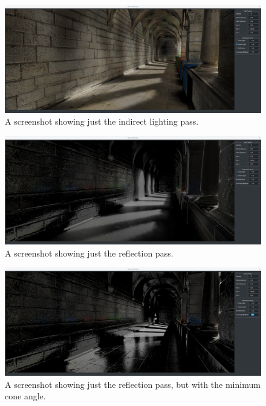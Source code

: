 \documentclass[]{acmsiggraph}
\begin{document}
\begin{figure}[htbp]\centering
 \includegraphics[width=1.0\linewidth]{images/indirect_only}
 \caption{A screenshot showing just the indirect lighting pass.}
\end{figure}

\begin{figure}[htbp]\centering
 \includegraphics[width=1.0\linewidth]{images/reflection_only}
 \caption{A screenshot showing just the reflection pass.}
\end{figure}

\begin{figure}[htbp]\centering
 \includegraphics[width=1.0\linewidth]{images/reflection_only_no_roughness}
 \caption{A screenshot showing just the reflection pass, but with the minimum cone angle.}
\end{figure}
\end{document}
